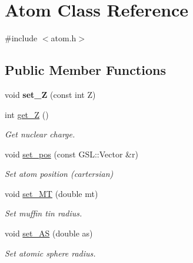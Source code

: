 \hypertarget{classAtom}{}\section{Atom Class Reference}
\label{classAtom}


{\ttfamily \#include $<$atom.\+h$>$}

\subsection*{Public Member Functions}
\begin{DoxyCompactItemize}
\item 
\mbox{\label{classAtom_aab0f819ed5580441fbeb6da23b06b35c}} 
void {\bfseries set\+\_\+Z} (const int Z)
\item 
\mbox{\label{classAtom_a02a19ad0654ca16b3f5897418da655ae}} 
int \hyperlink{classAtom_a02a19ad0654ca16b3f5897418da655ae}{get\+\_\+Z} ()
\begin{DoxyCompactList}\small\item\em Get nuclear charge. \end{DoxyCompactList}\item 
\mbox{\label{classAtom_a4882a9c424bd88153205c2692a81d0dd}} 
void \hyperlink{classAtom_a4882a9c424bd88153205c2692a81d0dd}{set\+\_\+pos} (const G\+S\+L\+::\+Vector \&r)
\begin{DoxyCompactList}\small\item\em Set atom position (cartersian) \end{DoxyCompactList}\item 
\mbox{\label{classAtom_a3295af53c32e694d912f23c3c88e73e3}} 
void \hyperlink{classAtom_a3295af53c32e694d912f23c3c88e73e3}{set\+\_\+\+MT} (double mt)
\begin{DoxyCompactList}\small\item\em Set muffin tin radius. \end{DoxyCompactList}\item 
\mbox{\label{classAtom_a32ee3cf43681e3bc4f4aefe9f515e169}} 
void \hyperlink{classAtom_a32ee3cf43681e3bc4f4aefe9f515e169}{set\+\_\+\+AS} (double as)
\begin{DoxyCompactList}\small\item\em Set atomic sphere radius. \end{DoxyCompactList}\item 

\end{DoxyCompactItemize}
